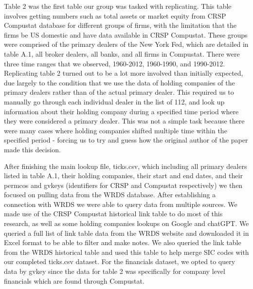 \documentclass{article}
\begin{document}
\par

Table 2 was the first table our group was tasked with replicating. This table involves getting numbers such as total assets or market equity from CRSP Compustat database for different groups of firms, with the limitation that the firms be US domestic and have data available in CRSP Compustat. These groups were comprised of the primary dealers of the New York Fed, which are detailed in table A.1, all broker dealers, all banks, and all firms in Compustat. There were three time ranges that we observed, 1960-2012, 1960-1990, and 1990-2012. Replicating table 2 turned out to be a lot more involved than initially expected, due largely to the condition that we use the data of holding companies of the primary dealers rather than of the actual primary dealer. This required us to manually go through each individual dealer in the list of 112, and look up information about their holding company during a specified time period where they were considered a primary dealer. This was not a simple task because there were many cases where holding companies shifted multiple time within the specified period - forcing us to try and guess how the original author of the paper made this decision.

After finishing the main lookup file, ticks.csv, which including all primary dealers listed in table A.1, their holding companies, their start and end dates, and their permcos and gvkeys (identifiers for CRSP and Compustat respectively) we then focused on pulling data from the WRDS database. After establishing a connection with WRDS we were able to query data from multiple sources. We made use of the CRSP Compustat historical link table to do most of this research, as well as some holding companies lookups on Google and chatGPT. We queried a full list of link table data from the WRDS website and downloaded it in Excel format to be able to filter and make notes. We also queried the link table from the WRDS historical table and used this table to help merge SIC codes with our completed ticks.csv dataset. For the financials dataset, we opted to query data by gvkey since the data for table 2 was specifically for company level financials which are found through Compustat.
\end{document}
